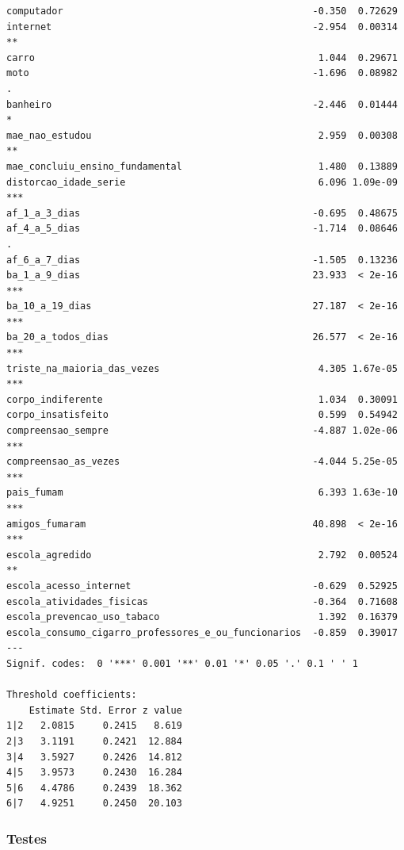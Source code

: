 \documentclass[
]{article}
\begin{document}
\begin{verbatim}
computador                                            -0.350  0.72629    
internet                                              -2.954  0.00314 ** 
carro                                                  1.044  0.29671    
moto                                                  -1.696  0.08982 .  
banheiro                                              -2.446  0.01444 *  
mae_nao_estudou                                        2.959  0.00308 ** 
mae_concluiu_ensino_fundamental                        1.480  0.13889    
distorcao_idade_serie                                  6.096 1.09e-09 ***
af_1_a_3_dias                                         -0.695  0.48675    
af_4_a_5_dias                                         -1.714  0.08646 .  
af_6_a_7_dias                                         -1.505  0.13236    
ba_1_a_9_dias                                         23.933  < 2e-16 ***
ba_10_a_19_dias                                       27.187  < 2e-16 ***
ba_20_a_todos_dias                                    26.577  < 2e-16 ***
triste_na_maioria_das_vezes                            4.305 1.67e-05 ***
corpo_indiferente                                      1.034  0.30091    
corpo_insatisfeito                                     0.599  0.54942    
compreensao_sempre                                    -4.887 1.02e-06 ***
compreensao_as_vezes                                  -4.044 5.25e-05 ***
pais_fumam                                             6.393 1.63e-10 ***
amigos_fumaram                                        40.898  < 2e-16 ***
escola_agredido                                        2.792  0.00524 ** 
escola_acesso_internet                                -0.629  0.52925    
escola_atividades_fisicas                             -0.364  0.71608    
escola_prevencao_uso_tabaco                            1.392  0.16379    
escola_consumo_cigarro_professores_e_ou_funcionarios  -0.859  0.39017    
---
Signif. codes:  0 '***' 0.001 '**' 0.01 '*' 0.05 '.' 0.1 ' ' 1

Threshold coefficients:
    Estimate Std. Error z value
1|2   2.0815     0.2415   8.619
2|3   3.1191     0.2421  12.884
3|4   3.5927     0.2426  14.812
4|5   3.9573     0.2430  16.284
5|6   4.4786     0.2439  18.362
6|7   4.9251     0.2450  20.103
\end{verbatim}

\hypertarget{testes}{%
\subsubsection{Testes}\label{testes}}
\end{document}
